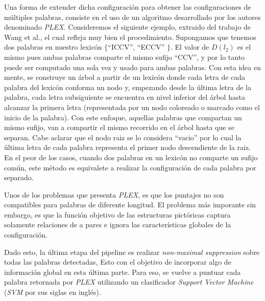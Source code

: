 	Una forma de extender dicha configuración para obtener las configuraciones de múltiples palabras, consiste en el uso de un algoritmo desarrollado por los autores denominado \textit{PLEX}. Consideremos el siguiente ejemplo, extraido del trabajo de Wang et al., el cual refleja muy bien el procedimiento. Supongamos que tenemos dos palabras en nuestro lexicón $\{$``ICCV'', ``ECCV'' $\}$. El valor de $D(l_2)$ es el mismo pues ambas palabras comparte el mismo sufijo ``CCV'', y por lo tanto puede ser computado una sola vez y usado para ambas palabras. Con esta idea en mente, se construye un árbol a partir de un lexicón donde cada letra de cada palabra del lexicón conforma un nodo y, empezando desde la última letra de la palabra, cada letra subsiguiente se encuentra en nivel inferior del árbol hasta alcanzar la primera letra (representada por un nodo coloreado o marcado como el inicio de la palabra). Con este enfoque, aquellas palabras que compartan un mismo sufijo, van a compartir el mismo recorrido en el árbol hasta que se separan. Cabe aclarar que el nodo raiz se lo considera ``vacio'' por lo cual la última letra de cada palabra representa el primer nodo descendiente de la raiz. En el peor de los casos, cuando dos palabras en un lexicón no comparte un sufijo común, este método es equivalete a realizar la configuración de cada palabra por separado.
	
	Unos de los problemas que presenta \textit{PLEX}, es que los puntajes no son compatibles para palabras de diferente longitud. El problema más imporante sin embargo, es que la función objetivo de las estructuras pictóricas captura solamente relaciones de a pares e ignora las características globales de la configuración.
	
	Dado esto, la última etapa del pipeline es realizar \textit{non-maximal suppression} sobre todas las palabras detectadas, Esto con el objetivo de incorporar algo de información global en esta última parte. Para eso, se vuelve a puntuar cada palabra retornada por \textit{PLEX} utilizando un clasificador \textit{Support Vector Machine} (\textit{SVM} por sus siglas en inglés).

	